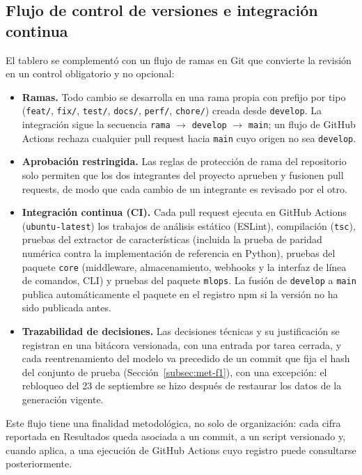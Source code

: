 \subsection{Flujo de control de versiones e integración continua}
\label{subsec:met-flujo}
El tablero se complementó con un flujo de ramas en Git que convierte la revisión en un control
obligatorio y no opcional:

\begin{itemize}
    \item \textbf{Ramas.} Todo cambio se desarrolla en una rama propia con prefijo por tipo
    (\texttt{feat/}, \texttt{fix/}, \texttt{test/}, \texttt{docs/}, \texttt{perf/},
    \texttt{chore/}) creada desde \texttt{develop}. La integración sigue la secuencia
    \texttt{rama} $\rightarrow$ \texttt{develop} $\rightarrow$ \texttt{main}; un flujo de
    GitHub Actions rechaza cualquier pull request hacia \texttt{main} cuyo origen no sea
    \texttt{develop}.
    \item \textbf{Aprobación restringida.} Las reglas de protección de rama del repositorio solo
    permiten que los dos integrantes del proyecto aprueben y fusionen pull requests, de modo que
    cada cambio de un integrante es revisado por el otro.
    \item \textbf{Integración continua (CI).} Cada pull request ejecuta en GitHub Actions
    (\texttt{ubuntu-latest}) los trabajos de análisis estático (ESLint), compilación
    (\texttt{tsc}), pruebas del extractor de características (incluida la prueba de paridad
    numérica contra la implementación de referencia en Python), pruebas del paquete
    \texttt{core} (middleware, almacenamiento, webhooks y la interfaz de línea de comandos, CLI) y pruebas del paquete
    \texttt{mlops}. La fusión de \texttt{develop} a \texttt{main} publica automáticamente el
    paquete en el registro npm si la versión no ha sido publicada antes.
    \item \textbf{Trazabilidad de decisiones.} Las decisiones técnicas y su justificación se
    registran en una bitácora versionada, con una entrada por tarea cerrada, y cada
    reentrenamiento del modelo va precedido de un commit que fija el hash del conjunto de prueba
    (Sección~\ref{subsec:met-f1}), con una excepción: el rebloqueo del 23 de septiembre se hizo
    después de restaurar los datos de la generación vigente.
\end{itemize}

Este flujo tiene una finalidad metodológica, no solo de organización: cada cifra reportada en
Resultados queda asociada a un commit, a un script versionado y, cuando aplica, a una ejecución
de GitHub Actions cuyo registro puede consultarse posteriormente.

